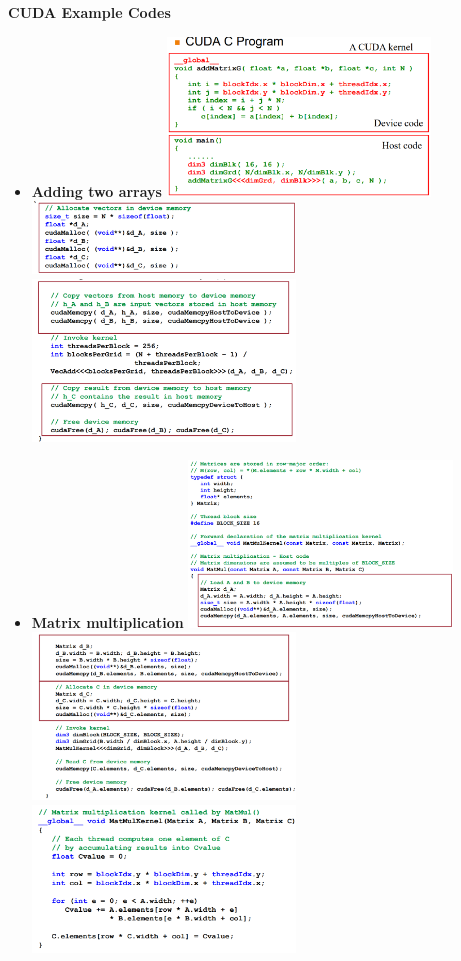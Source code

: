 \documentclass[10pt, landscape]{article}
\begin{document}
\begin{multicols}{4}
\textbf{CUDA Example Codes}
\begin{itemize}
    \item \textbf{Adding two arrays}
    \includegraphics*[width=7cm]{cuda_basic.png}
    \includegraphics*[width=7cm]{cuda_basic_allocate.png}
    \includegraphics*[width=7cm]{cuda_basic_kernel.png}
    \item \textbf{Matrix multiplication}
    \includegraphics*[width=7cm]{cuda_matrix_mult_1.png}
    \includegraphics*[width=7cm]{cuda_matrix_mult_2.png}
    \includegraphics*[width=7cm]{cuda_matrix_mult_3.png}
\end{itemize}




\end{multicols}
\end{document}
